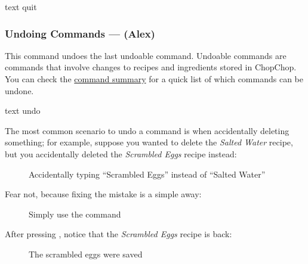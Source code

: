	 \begin{blockofcode}{text}
		quit
	\end{blockofcode}




\hypertarget{UndoCommand}{}
\subsubsection{Undoing Commands — \texttt{} (Alex)}

	This command undoes the last undoable command. Undoable commands are commands that involve changes to recipes and ingredients stored in ChopChop. You can check the \hyperlink{CommandSummary}{command summary} for a quick list of which commands can be undone.

	 \begin{blockofcode}{text}
		undo
	\end{blockofcode}

	The most common scenario to undo a command is when accidentally deleting something; for example, suppose you wanted to delete the
	\emph{Salted Water} recipe, but you accidentally deleted the \emph{Scrambled Eggs} recipe instead:

	\begin{figure}[!htbp]\centering\ContinuedFloat*
		\caption{Accidentally typing \enquote{Scrambled Eggs} instead of \enquote{Salted Water}}
	\end{figure}

	\pagebreak
	Fear not, because fixing the mistake is a simple  away:
	\vspace{-0.5em}

	\begin{figure}[!htbp]\centering\ContinuedFloat
		\caption{Simply use the  command}
	\end{figure}
	\vspace{-1.5em}

	After pressing , notice that the \emph{Scrambled Eggs} recipe is back:
	\vspace{-0.5em}

	\begin{figure}[!htbp]\centering\ContinuedFloat
		\caption{The scrambled eggs were saved}
	\end{figure}
	\vspace{-2em} %

